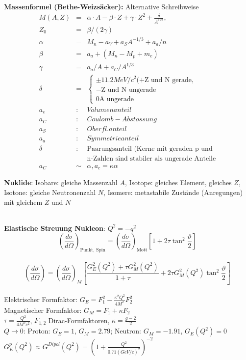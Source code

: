 \documentclass[10pt,twoside,a4paper]{article}
\begin{document}
\begin{multicols*}{3}
\textbf{Massenformel (Bethe-Weizsäcker):} 
Alternative Schreibweise
\begin{eqnarray*}
M(A,Z) &=& \alpha\cdot A - \beta \cdot Z + \gamma \cdot Z^2+\frac{\delta}{A^{1/2}},\\
 Z_0 &=& \beta/(2\gamma)\\
\alpha &=& M_n - a_V + a_SA^{-1/3} + a_a/n\\
\beta &=& a_a + (M_n - M_p + m_e)\\
\gamma &=& a_a/A + a_C/A^{1/3}\\
\delta &=& \begin{cases}
\pm 11.2 MeV/c^2 (+ \text{Z und N gerade},\\
 - \text{Z und N ungerade}\\
0 \text{A ungerade}
\end{cases}\\
a_v &:& Volumenanteil\\
a_C &:& Coulomb-Abstossung\\
a_S &:&Oberfl.anteil\\
a_a &:&Symmetrieanteil\\
\delta &:&\text{Paarungsanteil (Kerne mit geraden p und }\\~&~&\text{n-Zahlen sind stabiler als ungerade Anteile}\\
a_C &\sim& \alpha, a_c = \kappa \alpha 
\end{eqnarray*}


\textbf{Nuklide}: Isobare: gleiche Massenzahl $A$, Isotope: gleiches Element, gleiches $Z$, Isotone: gleiche Neutronenzahl $N$, Isomere: metastabile Zustände (Anregungen) mit gleichem $Z$ und $N$

\ \\
\textbf{Elastische Streuung Nukleon}: $Q^2 = -q^2$ \\
$$\left(\frac{d\sigma}{d\Omega}\right)_{\text{Punkt, Spin}} = \left(\frac{d\sigma}{d\Omega}\right)_{\text{Mott}} \left[ 1 + 2 \tau \tan^2 \frac{\vartheta}{2} \right]$$ \\
$$\scriptscriptstyle{\left(\frac{d\sigma}{d\Omega}\right) = \left(\frac{d\sigma}{d\Omega}\right)_{M} \left[ \frac{G^2_E(Q^2) + \tau G^2_M(Q^2)}{1 + \tau} + 2 \tau G^2_M(Q^2) \tan^2 \frac{\vartheta}{2} \right]}$$ \\
Elektrischer Formfaktor: $G_E = F^2_1 - \frac{\kappa^2 Q^2}{4 M^2} F^2_2$ \\
Magnetischer Formfaktor: $G_M = F_1 + \kappa F_2$ \\
$\tau = \frac{Q^2}{4M^2 c^2}$, $F_{1,2}$ Dirac-Formfaktoren, $\kappa = \frac{g-2}{2}$ \\
$Q \to 0$: Proton: $G_E=1$, $G_M=2.79$; Neutron: $G_M=-1.91$, $G_E(Q^2)=0$ \\
$G^p_E(Q^2) \approx G^{Dipol}(Q^2) = \left(1 + \frac{Q^2}{0.71 (GeV/c)^2}\right)^{-2}$


\end{multicols*}
\end{document}
